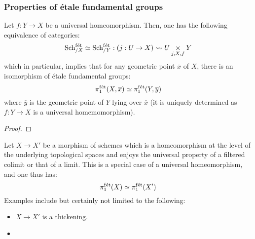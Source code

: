             \subsubsection{Properties of \'etale fundamental groups}
                \begin{theorem} \label{theorem: etale_fundamental_groups_are_unique_up_to_universal_homeomorphisms}
                    Let $f: Y \to X$ be a universal homeomorphism. Then, one has the following equivalence of categories:
                        $$\Sch_{/X}^{\fet} \cong \Sch_{/Y}^{\fet}: (j: U \to X) \mapsto U \x_{j, X, f} Y$$
                    which in particular, implies that for any geometric point $\overline{x}$ of $X$, there is an isomorphism of \'etale fundamental groups:
                        $$\pi_1^{\mathrm{f\acute{e}t}}(X, \overline{x}) \simeq \pi_1^{\mathrm{f\acute{e}t}}(Y, \overline{y})$$
                    where $\overline{y}$ is the geometric point of $Y$ lying over $\overline{x}$ (it is uniquely determined as $f: Y \to X$ is a universal homemomorphism). 
                \end{theorem}
                    \begin{proof}
                        
                    \end{proof}
                \begin{corollary}
                    Let $X \to X'$ be a morphism of schemes which is a homeomorphism at the level of the underlying topological spaces and enjoys the universal property of a  filtered colimit or that of a limit. This is a special case of a universal homeomorphism, and one thus has:
                        $$\pi_1^{\mathrm{f\acute{e}t}}(X) \simeq \pi_1^{\mathrm{f\acute{e}t}}(X')$$
                    Examples include but certainly not limited to the following:
                        \begin{itemize}
                            \item $X \to X'$ is a thickening.
                            \item 
                        \end{itemize}
                \end{corollary}
    

